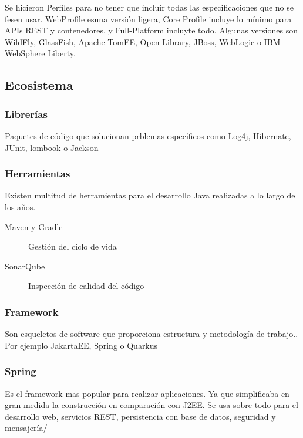     Se hicieron Perfiles para no tener que incluir todas las especificaciones que no se fesen  usar. WebProfile esuna versión ligera, Core Profile incluye lo mínimo para APIs REST y contenedores, y Full-Platform incluyte todo. Algunas versiones son WildFly, GlassFish, Apache TomEE, Open Library, JBoss, WebLogic o IBM WebSphere Liberty.


\subsection{Ecosistema}

    \subsubsection{Librerías}
        Paquetes de código que solucionan prblemas específicos como Log4j, Hibernate, JUnit, lombook o Jackson

    \subsubsection{Herramientas}
        Existen multitud de herramientas para el desarrollo Java realizadas a lo largo de los años.
        \begin{description}
            \item[Maven y Gradle] Gestión del ciclo de vida
            \item[SonarQube] Inspección de calidad del código
        \end{description}

    \subsubsection{Framework}
        Son esqueletos de software que proporciona estructura y metodología de trabajo.. Por ejemplo JakartaEE, Spring o Quarkus

    \subsubsection{Spring}
        Es el framework  mas popular para realizar aplicaciones. Ya que simplificaba en gran medida la construcción en comparación con J2EE. Se usa sobre todo para el desarrollo web, servicios REST, persistencia con base de datos, seguridad y mensajería/

